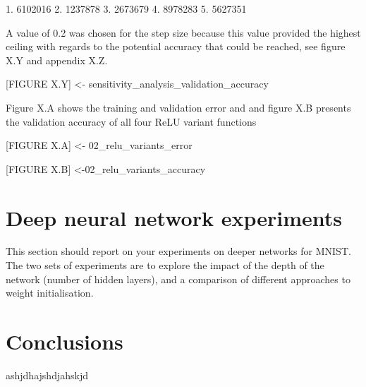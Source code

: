\documentclass{article}
\begin{document}
1. 6102016
2. 1237878
3. 2673679
4. 8978283
5. 5627351

A value of 0.2 was chosen for the step size because this value provided the highest ceiling with regards to the potential accuracy that could be reached, see figure X.Y and appendix X.Z.

[FIGURE X.Y] <- sensitivity_analysis_validation_accuracy

Figure X.A shows the training and validation error and and figure X.B presents the validation accuracy of all four ReLU variant functions

[FIGURE X.A] <- 02_relu_variants_error

[FIGURE X.B] <-02_relu_variants_accuracy

\section{Deep neural network experiments}
\label{sec:dnnexpts}
This section should report on your experiments on deeper networks for MNIST.  The two sets of experiments are to explore the impact of the depth of the network (number of hidden layers), and a comparison of different approaches to weight initialisation.

\section{Conclusions}
\label{sec:concl}
ashjdhajshdjahskjd


\end{document}
